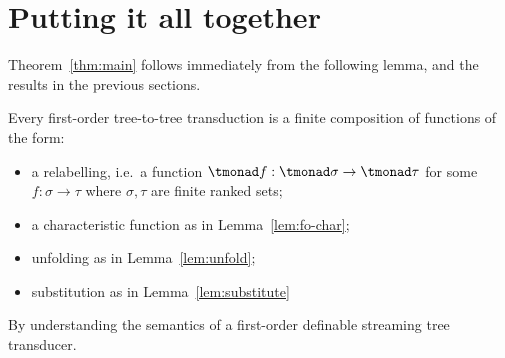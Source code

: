 \section{Putting it all together}


Theorem~\ref{thm:main} follows immediately from the following lemma, and the results in the previous sections.

\begin{lemma}
    Every first-order tree-to-tree transduction is a finite composition of functions of the form:
    \begin{itemize}
        \item a relabelling, i.e.~a function $\tmonad f : \tmonad \sigma \to \tmonad \tau$ for some $f : \sigma \to \tau$ where $\sigma,\tau$ are finite ranked sets;
        \item a characteristic function as in Lemma~\ref{lem:fo-char};
        \item unfolding as in Lemma~\ref{lem:unfold};
        \item substitution as in Lemma~\ref{lem:substitute}
    \end{itemize}
\end{lemma}
\begin{pr}
    By understanding the semantics of a first-order definable streaming tree transducer.
\end{pr}  
